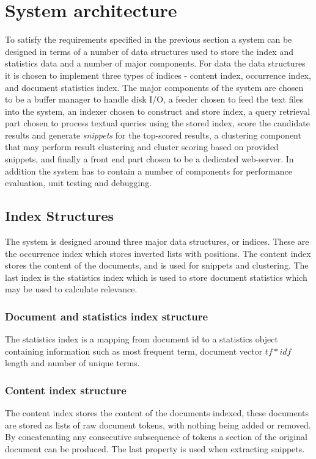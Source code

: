 \chapter{System architecture}
\label{sec:architecture}
\thispagestyle{fancy}

To satisfy the requirements specified in the previous section a system can be designed in terms of a number of data structures used to store the index and statistics data and a number of major components. For data the data structures it is chosen to implement three types of indices - content index, occurrence index, and document statistics index. The major components of the system are chosen to be a buffer manager to handle disk I/O, a feeder chosen to feed the text files into the system, an indexer chosen to construct and store index, a query retrieval part chosen to process textual queries using the stored index, score the candidate results and generate {\it snippets} for the top-scored results, a clustering component that may perform result clustering and cluster scoring based on provided snippets, and finally a front end part chosen to be a dedicated web-server. In addition the system has to contain a number of components for performance evaluation, unit testing and debugging.

\section{Index Structures}
The system is designed around three major data structures, or indices. These are the occurrence index which stores inverted lists with positions. The content index stores the content of the documents, and is used for snippets and clustering. The last index is the statistics index which is used to store document statistics which may be used to calculate relevance. 

\subsection{Document and statistics index structure}\label{sub:statistics_index_structure}
The statistics index is a mapping from document id to a statistics object containing information such as most frequent term, document vector $tf*idf$ length and number of unique terms.

\subsection{Content index structure}\label{sub:content_index_structure}
The content index stores the content of the documents indexed, these documents are stored as lists of raw document tokens, with nothing being added or removed. By concatenating any consecutive subsequence of tokens a section of the original document can be produced. The last property is used when extracting snippets.  

